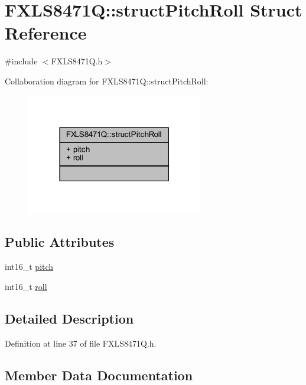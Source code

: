 \hypertarget{struct_f_x_l_s8471_q_1_1struct_pitch_roll}{}\section{F\+X\+L\+S8471Q\+:\+:struct\+Pitch\+Roll Struct Reference}
\label{struct_f_x_l_s8471_q_1_1struct_pitch_roll}


{\ttfamily \#include $<$F\+X\+L\+S8471\+Q.\+h$>$}



Collaboration diagram for F\+X\+L\+S8471Q\+:\+:struct\+Pitch\+Roll\+:\nopagebreak
\begin{figure}[H]
\begin{center}
\leavevmode
\includegraphics[width=218pt]{struct_f_x_l_s8471_q_1_1struct_pitch_roll__coll__graph}
\end{center}
\end{figure}
\subsection*{Public Attributes}
\begin{DoxyCompactItemize}
\item 
int16\+\_\+t \hyperlink{struct_f_x_l_s8471_q_1_1struct_pitch_roll_a791ce9465df778f0d9d427e385846339}{pitch}
\item 
int16\+\_\+t \hyperlink{struct_f_x_l_s8471_q_1_1struct_pitch_roll_a5e5050027616d5b16db640a74e31ce2f}{roll}
\end{DoxyCompactItemize}


\subsection{Detailed Description}


Definition at line 37 of file F\+X\+L\+S8471\+Q.\+h.



\subsection{Member Data Documentation}
